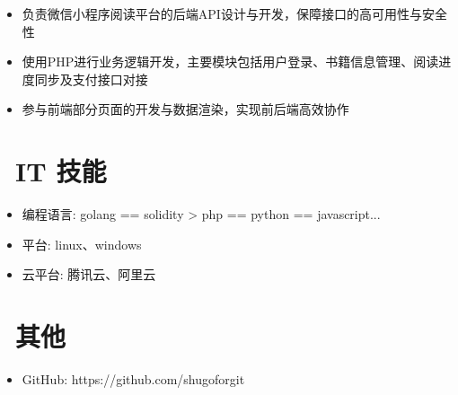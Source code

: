 \documentclass{resume}
\begin{document}

\begin{itemize}
  \item 负责微信小程序阅读平台的后端API设计与开发，保障接口的高可用性与安全性
  \item 使用PHP进行业务逻辑开发，主要模块包括用户登录、书籍信息管理、阅读进度同步及支付接口对接
  \item 参与前端部分页面的开发与数据渲染，实现前后端高效协作
\end{itemize}



\section{\faCogs\ IT 技能}
\begin{itemize}[parsep=0.5ex]
  \item 编程语言: golang == solidity >  php == python == javascript... 
  \item 平台: linux、windows
  \item 云平台: 腾讯云、阿里云
\end{itemize}

\section{\faInfo\ 其他}
\begin{itemize}[parsep=0.5ex]
  \item GitHub: https://github.com/shugoforgit
\end{itemize}

%
%
\end{document}
